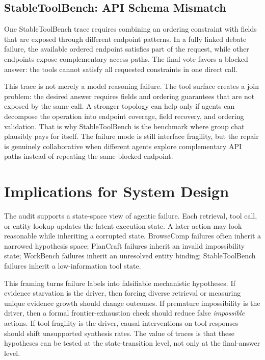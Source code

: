 \documentclass{article}
\theoremstyle{plain}
\theoremstyle{definition}
\theoremstyle{remark}
\begin{document}
\subsection{StableToolBench: API Schema Mismatch}
One StableToolBench trace requires combining an ordering constraint with fields that are exposed through different endpoint patterns. In a fully linked debate failure, the available ordered endpoint satisfies part of the request, while other endpoints expose complementary access paths. The final vote favors a blocked answer: the tools cannot satisfy all requested constraints in one direct call.

This trace is not merely a model reasoning failure. The tool surface creates a join problem: the desired answer requires fields and ordering guarantees that are not exposed by the same call. A stronger topology can help only if agents can decompose the operation into endpoint coverage, field recovery, and ordering validation. That is why StableToolBench is the benchmark where group chat plausibly pays for itself. The failure mode is still interface fragility, but the repair is genuinely collaborative when different agents explore complementary API paths instead of repeating the same blocked endpoint.

\section{Implications for System Design}
The audit supports a state-space view of agentic failure. Each retrieval, tool call, or entity lookup updates the latent execution state. A later action may look reasonable while inheriting a corrupted state. BrowseComp failures often inherit a narrowed hypothesis space; PlanCraft failures inherit an invalid impossibility state; WorkBench failures inherit an unresolved entity binding; StableToolBench failures inherit a low-information tool state.

This framing turns failure labels into falsifiable mechanistic hypotheses. If evidence starvation is the driver, then forcing diverse retrieval or measuring unique evidence growth should change outcomes. If premature impossibility is the driver, then a formal frontier-exhaustion check should reduce false \emph{impossible} actions. If tool fragility is the driver, causal interventions on tool responses should shift unsupported synthesis rates. The value of traces is that these hypotheses can be tested at the state-transition level, not only at the final-answer level.
\end{document}
